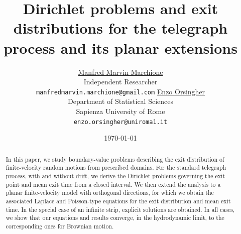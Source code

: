 \documentclass{article}
\title{Dirichlet problems and exit distributions for the telegraph process and its planar extensions}
\author{ %
	\href{https://orcid.org/0000-0002-6163-044X}{Manfred Marvin Marchione}\\
	Independent Researcher\\
	\texttt{manfredmarvin.marchione@gmail.com}
	\And
	\href{https://orcid.org/0000-0002-6421-533X}{Enzo Orsingher} \\
	Department of Statistical Sciences\\
	Sapienza University of Rome\\
	\texttt{enzo.orsingher@uniroma1.it}
}
\date{\today}
\begin{document}
\maketitle

\begin{abstract}
In this paper, we study boundary-value problems describing the exit distribution of finite-velocity random motions from prescribed domains. For the standard telegraph process, with and without drift, we derive the Dirichlet problems governing the exit point and mean exit time from a closed interval. We then extend the analysis to a planar finite-velocity model with orthogonal directions, for which we obtain the associated Laplace and Poisson-type equations for the exit distribution and mean exit time. In the special case of an infinite strip, explicit solutions are obtained. In all cases, we show that our equations and results converge, in the hydrodynamic limit, to the corresponding ones for Brownian motion.
\end{abstract}

\end{document}
